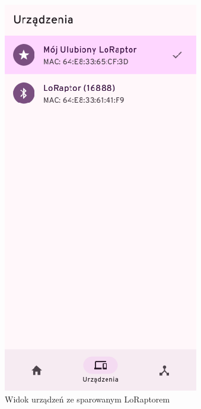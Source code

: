 \clearpage
\begin{figure}[H]
	\centering
	\begin{minipage}[b]{0.45\textwidth}
		\centering
		\includegraphics[width=\textwidth]{root/raptchat_devices.png}
		\caption{Widok urządzeń ze sparowanym LoRaptorem}

\end{minipage}
\end{figure}
